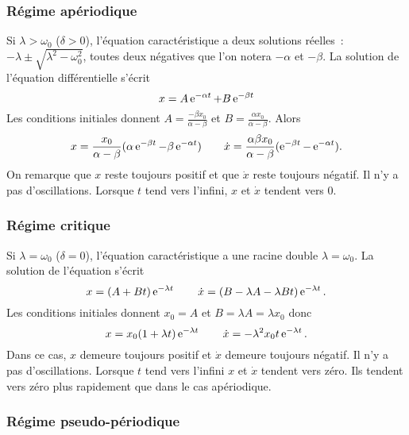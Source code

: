 \subsubsection{Régime apériodique}%
\label{chap5-subsubsec:aperiodique}%
%
Si \(\lambda>\omega_0\) (\(\delta>0\)), l'équation caractéristique a deux 
solutions réelles~: \(-\lambda \pm \sqrt{\lambda^2-\omega_0^2}\), toutes deux 
négatives que l'on notera \(-\alpha\) et \(-\beta\). La solution de l'équation 
différentielle s'écrit
\begin{equation}%
  x = A\e^{-\alpha t} +B\e^{-\beta t}
\end{equation}%
Les conditions initiales donnent \(A=\frac{-\beta x_0}{\alpha-\beta}\) et 
\(B=\frac{\alpha x_0}{\alpha-\beta}\). Alors
\begin{equation}%
  x = \frac{x_0}{\alpha - \beta}(\alpha \e^{-\beta t} - \beta \e^{-\alpha t}) 
  \qquad \dot x = \frac{\alpha \beta x_0}{\alpha - \beta}(\e^{-\beta t} - 
  \e^{-\alpha t}).
\end{equation}%
On remarque que \(x\) reste toujours positif et que \(\dot x\) reste toujours 
négatif. Il n'y a pas d'oscillations. Lorsque \(t\) tend vers l'infini, \(x\) 
et \(\dot x\) tendent vers \(0\).
%
\subsubsection{Régime critique}%
\label{chap5-subsubsec:critique}%
%
Si \(\lambda = \omega_0\) (\(\delta=0\)), l'équation caractéristique a une 
racine double \(\lambda=\omega_0\). La solution de l'équation s'écrit
\begin{equation}%
  x = (A+Bt)\e^{-\lambda t} \qquad \dot x = (B-\lambda A-\lambda B 
  t)\e^{-\lambda t}.
\end{equation}%
Les conditions initiales donnent \(x_0=A\) et \(B=\lambda A=\lambda x_0\) donc
\begin{equation}%
  x = x_0(1+\lambda t)\e^{-\lambda t} \qquad \dot x = -\lambda^2 x_0 t 
  \e^{-\lambda t}.
\end{equation}%
%
Dans ce cas, \(x\) demeure toujours positif et \(\dot x\) demeure toujours 
négatif. Il n'y a pas d'oscillations. Lorsque \(t\) tend vers l'infini \(x\) et 
\(\dot x\) tendent vers zéro. Ils tendent vers zéro plus rapidement que dans le 
cas apériodique.
%
\subsubsection{Régime pseudo-périodique}%
\label{chap5-subsubsec:pseudoperiodique}%

